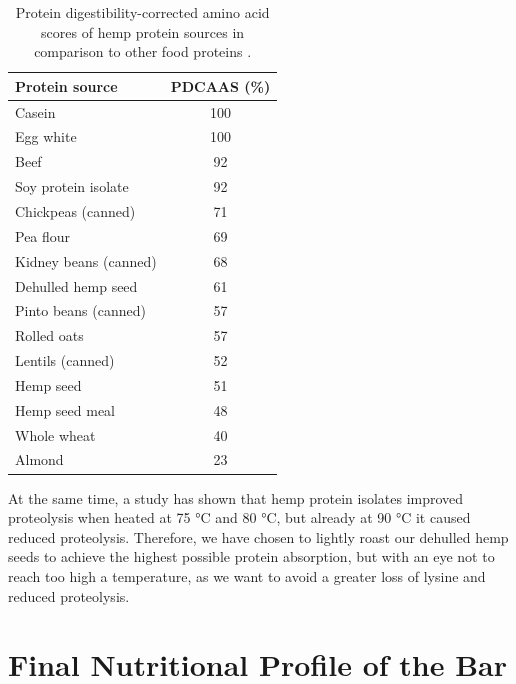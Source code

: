 \begin{table}[h]
    \centering
    \caption{Protein digestibility-corrected amino acid scores of hemp protein sources in comparison to other food proteins \cite*{house2010evaluating}.}
    \label{tab:process_table_01}
    \begin{tabular}{l c}
    \hline
    \textbf{Protein source} & \textbf{PDCAAS (\%)} \\
    \hline
    Casein               & 100 \\
    Egg white            & 100 \\
    Beef                 & 92  \\
    Soy protein isolate  & 92  \\
    Chickpeas (canned)   & 71  \\
    Pea flour            & 69  \\
    Kidney beans (canned)& 68  \\
    Dehulled hemp seed   & 61  \\
    Pinto beans (canned) & 57  \\
    Rolled oats          & 57  \\
    Lentils (canned)     & 52  \\
    Hemp seed            & 51  \\
    Hemp seed meal       & 48  \\
    Whole wheat          & 40  \\
    Almond               & 23  \\
    \hline
    \end{tabular}
\end{table}

\vspace{1em}
At the same time, a study has shown that hemp protein isolates improved proteolysis when heated at 75 °C and 80 °C, but already at 90 °C it caused reduced proteolysis. \cite*{aluko2017hemp} Therefore, we have chosen to lightly roast our dehulled hemp seeds to achieve the highest possible protein absorption, but with an eye not to reach too high a temperature, as we want to avoid a greater loss of lysine and reduced proteolysis.


\section{Final Nutritional Profile of the Bar}
